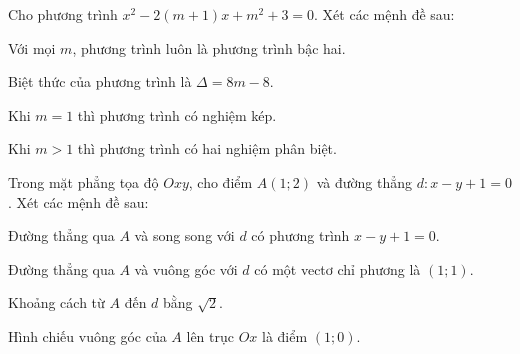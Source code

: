 
\NQuestion Cho phương trình $x^2-2(m+1)x+m^2+3=0$. Xét các mệnh đề sau:

\begin{SubQuestions}
\item Với mọi $m$, phương trình luôn là phương trình bậc hai.
\item Biệt thức của phương trình là $\Delta=8m-8$.
\item Khi $m=1$ thì phương trình có nghiệm kép.
\item Khi $m>1$ thì phương trình có hai nghiệm phân biệt.
\end{SubQuestions}

\NQuestion Trong mặt phẳng tọa độ $Oxy$, cho điểm $A(1;2)$ và đường thẳng $d:x-y+1=0$. Xét các mệnh đề sau:

\begin{SubQuestions}
\item Đường thẳng qua $A$ và song song với $d$ có phương trình $x-y+1=0$.
\item Đường thẳng qua $A$ và vuông góc với $d$ có một vectơ chỉ phương là $(1;1)$.
\item Khoảng cách từ $A$ đến $d$ bằng $\sqrt{2}$.
\item Hình chiếu vuông góc của $A$ lên trục $Ox$ là điểm $(1;0)$.
\end{SubQuestions}
